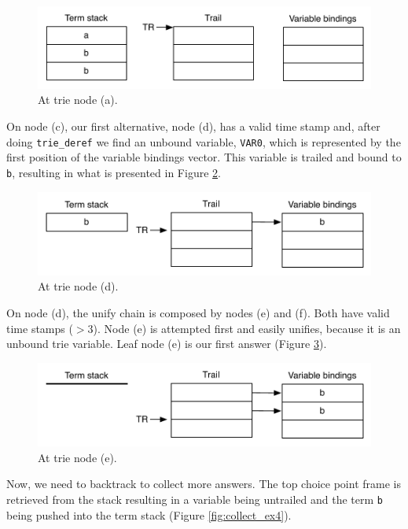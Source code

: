 \begin{figure}[H]
  \centering
    \includegraphics[scale=0.6]{collect_ex1.pdf}
  \caption{At trie node (a).}
  \label{fig:collect_ex1}
\end{figure}

On node (c), our first alternative, node (d), has a valid time stamp and, after doing
\texttt{trie\_deref} we find an unbound variable, \texttt{VAR0}, which is represented
by the first position of the variable bindings vector.
This variable is trailed and bound to \texttt{b},
resulting in what is presented in Figure \ref{fig:collect_ex2}.

\begin{figure}[H]
  \centering
    \includegraphics[scale=0.6]{collect_ex2.pdf}
  \caption{At trie node (d).}
  \label{fig:collect_ex2}
\end{figure}

On node (d), the unify chain is composed by nodes (e) and (f). Both have valid time stamps ($> 3$).
Node (e) is attempted first and easily unifies, because it is an unbound trie variable.
Leaf node (e) is our first answer (Figure \ref{fig:collect_ex3}).

\begin{figure}[H]
  \centering
    \includegraphics[scale=0.6]{collect_ex3.pdf}
  \caption{At trie node (e).}
  \label{fig:collect_ex3}
\end{figure}

Now, we need to backtrack to collect more answers. The top choice point frame is retrieved from the stack resulting in a variable being untrailed and the term \texttt{b} being pushed into the term stack (Figure \ref{fig:collect_ex4}).

